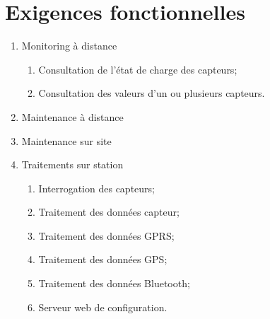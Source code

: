 
\section{Exigences fonctionnelles}

    \begin{enumerate}

    
        \item Monitoring à distance
            \begin{enumerate}
                \item Consultation de l'état de charge des capteurs;
                \item Consultation des valeurs d'un ou plusieurs
                         capteurs.
            \end{enumerate}

        \item Maintenance à distance
        
        \item Maintenance sur site

        \item Traitements sur station
            \begin{enumerate}
                \item Interrogation des capteurs;
                \item Traitement des données capteur;
                \item Traitement des données GPRS;
                \item Traitement des données GPS;
                \item Traitement des données Bluetooth;
                \item Serveur web de configuration.
            \end{enumerate}
    \end{enumerate}

